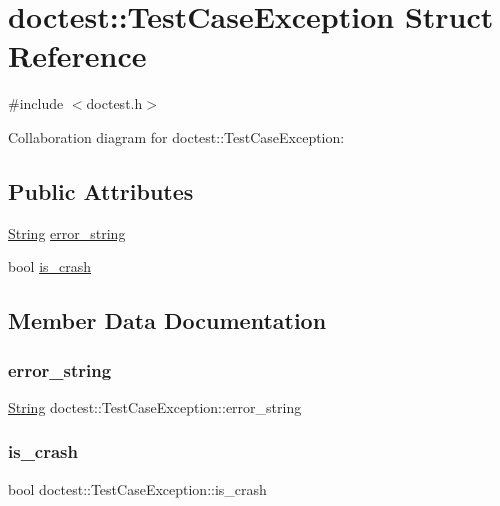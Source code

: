 \hypertarget{structdoctest_1_1_test_case_exception}{}\section{doctest\+:\+:Test\+Case\+Exception Struct Reference}
\label{structdoctest_1_1_test_case_exception}


{\ttfamily \#include $<$doctest.\+h$>$}



Collaboration diagram for doctest\+:\+:Test\+Case\+Exception\+:
\subsection*{Public Attributes}
\begin{DoxyCompactItemize}
\item 
\hyperlink{classdoctest_1_1_string}{String} \hyperlink{structdoctest_1_1_test_case_exception_a656c8971ccbedc7d3a0a38f7c6af927e}{error\+\_\+string}
\item 
bool \hyperlink{structdoctest_1_1_test_case_exception_af30d801dae6dd2f4ea01690bbf5faeca}{is\+\_\+crash}
\end{DoxyCompactItemize}


\subsection{Member Data Documentation}
\mbox{\label{structdoctest_1_1_test_case_exception_a656c8971ccbedc7d3a0a38f7c6af927e}} 
\subsubsection{\texorpdfstring{error\+\_\+string}{error\_string}}
{\footnotesize\ttfamily \hyperlink{classdoctest_1_1_string}{String} doctest\+::\+Test\+Case\+Exception\+::error\+\_\+string}

\mbox{\label{structdoctest_1_1_test_case_exception_af30d801dae6dd2f4ea01690bbf5faeca}} 
\subsubsection{\texorpdfstring{is\+\_\+crash}{is\_crash}}
{\footnotesize\ttfamily bool doctest\+::\+Test\+Case\+Exception\+::is\+\_\+crash}

